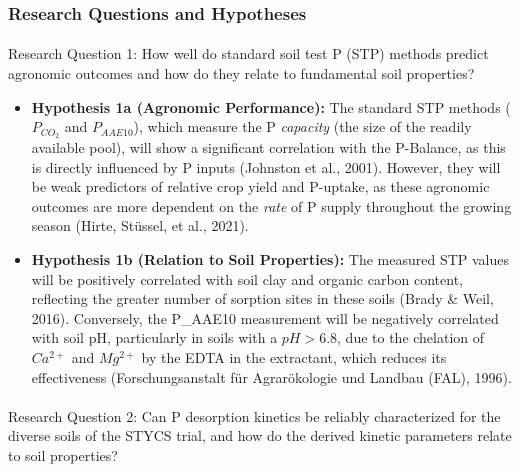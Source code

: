 \documentclass[
  a4paper,
]{article}
\makeatletter
\let\oldparagraph\paragraph
\renewcommand{\paragraph}{
    \@ifstar
      \xxxParagraphStar
      \xxxParagraphNoStar
  }
\newcommand{\xxxParagraphStar}[1]{\oldparagraph*{#1}\mbox{}}
\newcommand{\xxxParagraphNoStar}[1]{\oldparagraph{#1}\mbox{}}
\makeatother
\begin{document}
\subsubsection{Research Questions and
Hypotheses}\label{research-questions-and-hypotheses}

\paragraph{Research Question 1: How well do standard soil test P (STP)
methods predict agronomic outcomes and how do they relate to fundamental
soil
properties?}\label{research-question-1-how-well-do-standard-soil-test-p-stp-methods-predict-agronomic-outcomes-and-how-do-they-relate-to-fundamental-soil-properties}

\begin{itemize}
\item
  \textbf{Hypothesis 1a (Agronomic Performance):} The standard STP
  methods (\(P_{CO_2}\) and \(P_{AAE10}\)), which measure the P
  \emph{capacity} (the size of the readily available pool), will show a
  significant correlation with the P-Balance, as this is directly
  influenced by P inputs (Johnston et al., 2001). However, they will be
  weak predictors of relative crop yield and P-uptake, as these
  agronomic outcomes are more dependent on the \emph{rate} of P supply
  throughout the growing season (Hirte, Stüssel, et al., 2021).
\item
  \textbf{Hypothesis 1b (Relation to Soil Properties):} The measured STP
  values will be positively correlated with soil clay and organic carbon
  content, reflecting the greater number of sorption sites in these
  soils (Brady \& Weil, 2016). Conversely, the P\_AAE10 measurement will
  be negatively correlated with soil pH, particularly in soils with a
  \(pH > 6.8\), due to the chelation of \(Ca^{2+}\) and \(Mg^{2+}\) by
  the EDTA in the extractant, which reduces its effectiveness
  (Forschungsanstalt für Agrarökologie und Landbau (FAL), 1996).
\end{itemize}

\paragraph{Research Question 2: Can P desorption kinetics be reliably
characterized for the diverse soils of the STYCS trial, and how do the
derived kinetic parameters relate to soil
properties?}\label{research-question-2-can-p-desorption-kinetics-be-reliably-characterized-for-the-diverse-soils-of-the-stycs-trial-and-how-do-the-derived-kinetic-parameters-relate-to-soil-properties}
\end{document}
